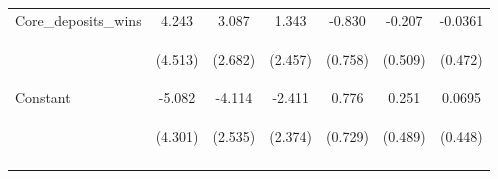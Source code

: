 \documentclass[]{article}
\begin{document}
\begin{center}
\begin{tabular}{lcccccc}
Core\_deposits\_wins & 4.243 & 3.087 & 1.343 & -0.830 & -0.207 & -0.0361 \\
\vspace{4pt} & \begin{footnotesize}(4.513)\end{footnotesize} & \begin{footnotesize}(2.682)\end{footnotesize} & \begin{footnotesize}(2.457)\end{footnotesize} & \begin{footnotesize}(0.758)\end{footnotesize} & \begin{footnotesize}(0.509)\end{footnotesize} & \begin{footnotesize}(0.472)\end{footnotesize} \\
Constant & -5.082 & -4.114 & -2.411 & 0.776 & 0.251 & 0.0695 \\
 & \begin{footnotesize}(4.301)\end{footnotesize} & \begin{footnotesize}(2.535)\end{footnotesize} & \begin{footnotesize}(2.374)\end{footnotesize} & \begin{footnotesize}(0.729)\end{footnotesize} & \begin{footnotesize}(0.489)\end{footnotesize} & \begin{footnotesize}(0.448)\end{footnotesize} \\
\vspace{4pt} & \begin{footnotesize}\end{footnotesize} & \begin{footnotesize}\end{footnotesize} & \begin{footnotesize}\end{footnotesize} & \begin{footnotesize}\end{footnotesize} & \begin{footnotesize}\end{footnotesize} & \begin{footnotesize}\end{footnotesize} \\

\end{tabular}
\end{center}
\end{document}
